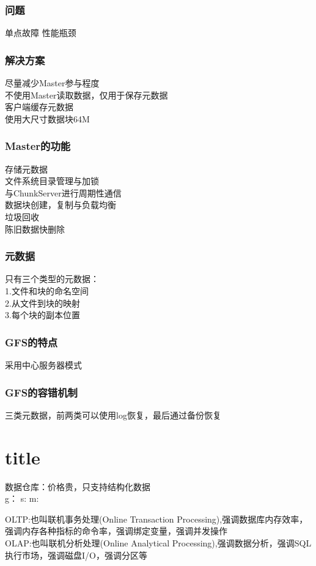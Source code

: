 \documentclass{article}
\begin{document}
\begin{CJK}{UTF8}{gbsn}
	\subsubsection*{问题}
	单点故障
	性能瓶颈
	\subsubsection*{解决方案}
	尽量减少Master参与程度\\
	不使用Master读取数据，仅用于保存元数据\\
	客户端缓存元数据\\
	使用大尺寸数据块64M\\
	\subsubsection*{Master的功能}
	存储元数据\\
	文件系统目录管理与加锁\\
	与ChunkServer进行周期性通信\\
	数据块创建，复制与负载均衡\\
	垃圾回收\\
	陈旧数据快删除\\
	\subsubsection*{元数据}
	只有三个类型的元数据：\\
	1.文件和块的命名空间\\
	2.从文件到块的映射\\
	3.每个块的副本位置\\
	\subsubsection*{GFS的特点}
	采用中心服务器模式\\
	
	
	\subsubsection*{GFS的容错机制}
	三类元数据，前两类可以使用log恢复，最后通过备份恢复\\
	
	
	\section*{title}
	数据仓库：价格贵，只支持结构化数据\\
	
	
	g：
	s:
	m:
	
	OLTP:也叫联机事务处理(Online Transaction Processing),强调数据库内存效率，强调内存各种指标的命令率，强调绑定变量，强调并发操作\\
	OLAP:也叫联机分析处理(Online Analytical Processing),强调数据分析，强调SQL执行市场，强调磁盘I/O，强调分区等\\
\end{CJK}
\end{document}
